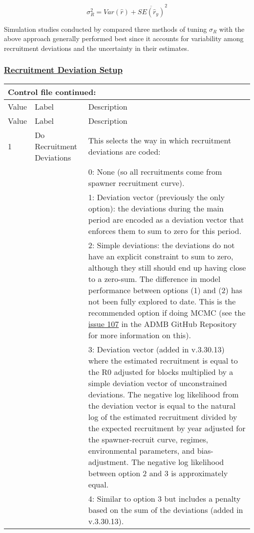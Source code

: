 \begin{equation}
	\sigma_R^2 = Var(\hat{r}) + \overline{SE(\hat{r}_y)}^2
\end{equation}

Simulation studies conducted by \citet{methot-adjusting-2011} compared three methods of tuning $\sigma_R$ with the above approach generally performed best since it accounts for variability among recruitment deviations and the uncertainty in their estimates.

\hypertarget{RecDevSetup}{}
\subsubsection[Recruitment Deviation Setup]{\protect\hyperlink{RecDevSetup}{Recruitment Deviation Setup}}
\begin{longtable}{p{1cm} p{3cm} p{12cm}}
	\multicolumn{3}{l}{Control file continued:} \\

	\hline
	Value & Label & Description \Tstrut\Bstrut\\
	\hline
	\endfirsthead

	\hline
	Value & Label & Description \Tstrut\Bstrut\\
	\hline
	\endhead
	\hline
	\endfoot
	\endlastfoot


	1 \Tstrut & Do Recruitment Deviations & This selects the way in which recruitment deviations are coded: \\
	  & & 0: None (so all recruitments come from spawner recruitment curve). \\
	  & & 1: Deviation vector (previously the only option): the deviations during the main period are encoded as a deviation vector that enforces them to sum to zero for this period. \\
	  & & 2: Simple deviations: the deviations do not have an explicit constraint to sum to zero, although they still should end up having close to a zero-sum. The difference in model performance between options (1) and (2) has not been fully explored to date. This is the recommended option if doing MCMC (see the \href{https://github.com/admb-project/admb/issues/107}{issue 107} in the ADMB GitHub Repository for more information on this). \\
	  & & 3: Deviation vector (added in v.3.30.13) where the estimated recruitment is equal to the R0 adjusted for blocks multiplied by a simple deviation vector of unconstrained deviations. The negative log likelihood from the deviation vector is equal to the natural log of the estimated recruitment divided by the expected recruitment by year adjusted for the spawner-recruit curve, regimes, environmental parameters, and bias-adjustment. The negative log likelihood between option 2 and 3 is approximately equal. \\
	  & & 4: Similar to option 3 but includes a penalty based on the sum of the deviations (added in v.3.30.13). \\
	\hline


\end{longtable}
